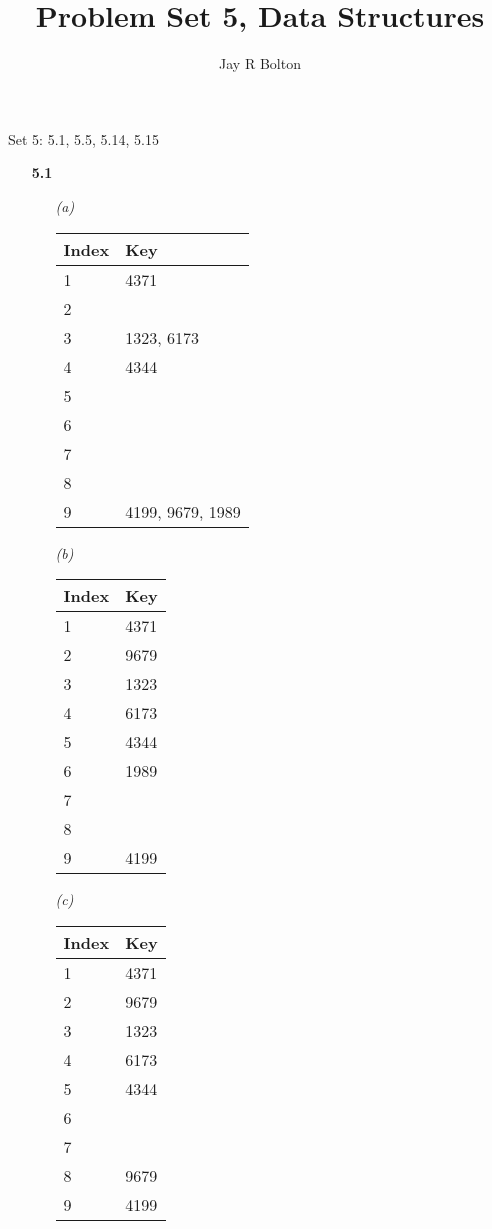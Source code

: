 \documentclass{article}
\title{Problem Set 5, Data Structures}
\author{Jay R Bolton}
\begin{document}
\maketitle

Set 5: 5.1, 5.5, 5.14, 5.15 

\begin{enumerate}

\item[\textbf{5.1}]

	\begin{enumerate}

	\item[\emph{(a)}]
	\begin{tabular}[t]{l | l}
	\textbf{Index} & \textbf{Key} \\ \hline
	1 & 4371 \\
	2 & \\
	3 & 1323, 6173  \\
	4 & 4344 \\
	5 & \\
	6 &  \\
	7 & \\
	8 & \\
	9 & 4199, 9679, 1989
	\end{tabular}

	\item[\emph{(b)}]
	\begin{tabular}[t]{l | l}
	\textbf{Index} & \textbf{Key} \\ \hline
	1 & 4371 \\
	2 & 9679 \\
	3 & 1323 \\
	4 & 6173 \\
	5 & 4344 \\
	6 & 1989 \\
	7 & \\
	8 & \\
	9 & 4199 
	\end{tabular}

	\item[\emph{(c)}]
	\begin{tabular}[t]{l | l}
	\textbf{Index} & \textbf{Key} \\ \hline
	1 & 4371 \\
	2 & 9679 \\
	3 & 1323 \\
	4 & 6173 \\
	5 & 4344 \\
	6 &  \\
	7 & \\
	8 & 9679 \\
	9 & 4199 \\
	\end{tabular}


\end{enumerate}
\end{enumerate}
\end{document}
